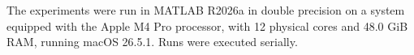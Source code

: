 The experiments were run in MATLAB R2026a in double precision on a system equipped with the Apple M4 Pro processor, with 12 physical cores and 48.0 GiB RAM, running macOS 26.5.1. Runs were executed serially.
